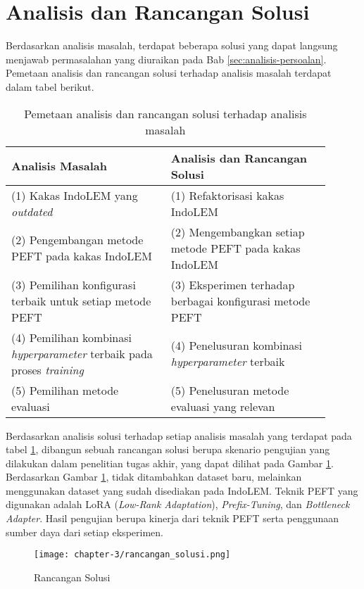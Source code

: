 \section{Analisis dan Rancangan Solusi}

Berdasarkan analisis masalah, terdapat beberapa solusi yang dapat langsung menjawab permasalahan yang diuraikan pada Bab \ref{sec:analisis-persoalan}. Pemetaan analisis dan rancangan solusi terhadap analisis masalah terdapat dalam tabel berikut.

\begin{table}[h!]
    \centering
    \begin{tabular}{|m{0.45\linewidth}|m{0.45\linewidth}|}
    \hline
    \rowcolor{black!10}
    \textbf{Analisis Masalah} & \textbf{Analisis dan Rancangan Solusi} \\ \hline
    (1) Kakas IndoLEM yang \textit{outdated} & (1) Refaktorisasi kakas IndoLEM \\ \hline
    (2) Pengembangan metode PEFT pada kakas IndoLEM & (2) Mengembangkan setiap metode PEFT pada kakas IndoLEM \\ \hline
    (3) Pemilihan konfigurasi terbaik untuk setiap metode PEFT & (3) Eksperimen terhadap berbagai konfigurasi metode PEFT \\ \hline
    (4) Pemilihan kombinasi \textit{hyperparameter} terbaik pada proses \textit{training} & (4) Penelusuran kombinasi \textit{hyperparameter} terbaik\\ \hline
    (5) Pemilihan metode evaluasi & (5) Penelusuran metode evaluasi yang relevan \\ \hline
    \end{tabular}
\caption{Pemetaan analisis dan rancangan solusi terhadap analisis masalah}
\label{table:pemetaan-masalah-solusi}
\end{table}

Berdasarkan analisis solusi terhadap setiap analisis masalah yang terdapat pada tabel \ref{table:pemetaan-masalah-solusi}, dibangun sebuah rancangan solusi berupa skenario pengujian yang dilakukan dalam penelitian tugas akhir, yang dapat dilihat pada Gambar \ref{fig:rancangan-solusi}. Berdasarkan Gambar \ref{fig:rancangan-solusi}, tidak ditambahkan dataset baru, melainkan menggunakan dataset yang sudah disediakan pada IndoLEM. Teknik PEFT yang digunakan adalah LoRA (\textit{Low-Rank Adaptation}), \textit{Prefix-Tuning}, dan \textit{Bottleneck Adapter}. Hasil pengujian berupa kinerja dari teknik PEFT serta penggunaan sumber daya dari setiap eksperimen.

\begin{figure}[ht]
    \centering
    \texttt{[image: chapter-3/rancangan\_solusi.png]}
    \caption{Rancangan Solusi}
    \label{fig:rancangan-solusi}
\end{figure}
